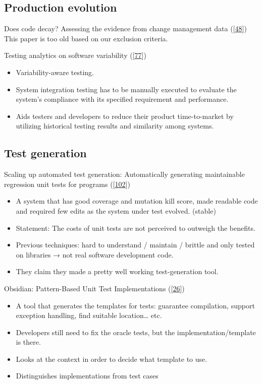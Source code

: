 \documentclass[]{book}
\providecommand{\tightlist}{%
  \setlength{\itemsep}{0pt}\setlength{\parskip}{0pt}}
\begin{document}
\subsection{Production evolution}\label{production-evolution}

Does code decay? Assessing the evidence from change management data
({[}\protect\hyperlink{ref-eick2001}{48}{]}) This paper is too old based
on our exclusion criteria.

Testing analytics on software variability
({[}\protect\hyperlink{ref-leung2015testing}{77}{]})

\begin{itemize}
\tightlist
\item
  Variability-aware testing.
\item
  System integration testing has to be manually executed to evaluate the
  system's compliance with its specified requirement and performance.
\item
  Aids testers and developers to reduce their product time-to-market by
  utilizing historical testing results and similarity among systems.
\end{itemize}

\subsection{Test generation}\label{test-generation}

Scaling up automated test generation: Automatically generating
maintainable regression unit tests for programs
({[}\protect\hyperlink{ref-robinson2011}{102}{]})

\begin{itemize}
\tightlist
\item
  A system that has good coverage and mutation kill score, made readable
  code and required few edits as the system under test evolved. (stable)
\item
  Statement: The costs of unit tests are not perceived to outweigh the
  benefits.
\item
  Previous techniques: hard to understand / maintain / brittle and only
  tested on libraries → not real software development code.
\item
  They claim they made a pretty well working test-generation tool.
\end{itemize}

Obsidian: Pattern-Based Unit Test Implementations
({[}\protect\hyperlink{ref-bowring2014obsidian}{26}{]})

\begin{itemize}
\tightlist
\item
  A tool that generates the templates for tests: guarantee compilation,
  support exception handling, find suitable location\ldots{} etc.
\item
  Developers still need to fix the oracle tests, but the
  implementation/template is there.
\item
  Looks at the context in order to decide what template to use.
\item
  Distinguishes implementations from test cases
\end{itemize}
\end{document}
